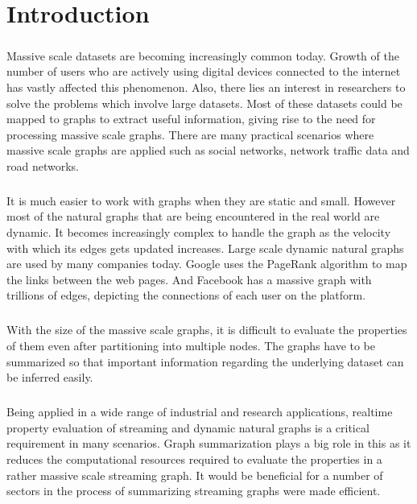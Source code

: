 \chapter{Introduction}

\paragraph{}
Massive scale datasets are becoming increasingly common today. Growth of the number of users who are actively using digital devices connected to the internet has vastly affected this phenomenon. Also, there lies an interest in researchers to solve the problems which involve large datasets. Most of these datasets could be mapped to graphs to extract useful information, giving rise to the need for processing massive scale graphs. There are many practical scenarios where massive scale graphs are applied such as social networks, network traffic data and road networks.

\paragraph{}
It is much easier to work with graphs when they are static and small. However most of the natural graphs that are being encountered in the real world are dynamic. It becomes increasingly complex to handle the graph as the velocity with which its edges gets updated increases. Large scale dynamic natural graphs are used by many companies today. Google uses the PageRank algorithm\cite{brin_anatomy_1998} to map the links between the web pages. And Facebook has a massive graph with trillions of edges\cite{ching_one_2015}, depicting the connections of each user on the platform. 

\paragraph{}
With the size of the massive scale graphs, it is difficult to evaluate the properties of them even after partitioning into multiple nodes. The graphs have to be summarized so that important information regarding the underlying dataset can be inferred easily.

\paragraph{}
Being applied in a wide range of industrial and research applications, realtime property evaluation of streaming and dynamic natural graphs is a critical requirement in many scenarios. Graph summarization plays a big role in this as it reduces the computational resources required to evaluate the properties in a rather massive scale streaming graph. It would be beneficial for a number of sectors in the process of summarizing streaming graphs were made efficient.